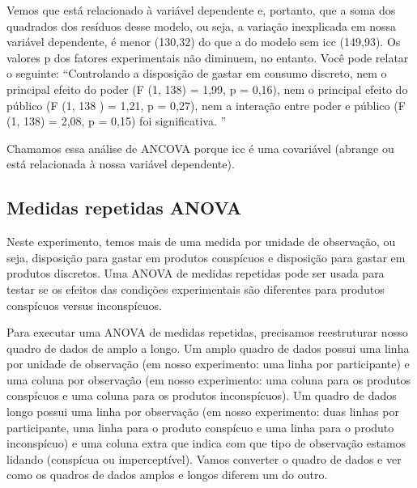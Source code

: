 \documentclass{article}
\begin{document}
Vemos que  está relacionado à variável dependente e, portanto, que a soma dos quadrados dos resíduos desse modelo, ou seja, a variação inexplicada em nossa variável dependente, é menor (130,32) do que a do modelo sem icc (149,93). Os valores p dos fatores experimentais não diminuem, no entanto. Você pode relatar o seguinte: “Controlando a disposição de gastar em consumo discreto, nem o principal efeito do poder (F (1, 138) = 1,99, p = 0,16), nem o principal efeito do público (F (1, 138 ) = 1,21, p = 0,27), nem a interação entre poder e público (F (1, 138) = 2,08, p = 0,15) foi significativa. ”

Chamamos essa análise de ANCOVA porque icc é uma covariável (abrange ou está relacionada à nossa variável dependente).


\subsection{Medidas repetidas ANOVA}

Neste experimento, temos mais de uma medida por unidade de observação, ou seja, disposição para gastar em produtos conspícuos e disposição para gastar em produtos discretos. Uma ANOVA de medidas repetidas pode ser usada para testar se os efeitos das condições experimentais são diferentes para produtos conspícuos versus inconspícuos.

Para executar uma ANOVA de medidas repetidas, precisamos reestruturar nosso quadro de dados de amplo a longo. Um amplo quadro de dados possui uma linha por unidade de observação (em nosso experimento: uma linha por participante) e uma coluna por observação (em nosso experimento: uma coluna para os produtos conspícuos e uma coluna para os produtos inconspícuos). Um quadro de dados longo possui uma linha por observação (em nosso experimento: duas linhas por participante, uma linha para o produto conspícuo e uma linha para o produto inconspícuo) e uma coluna extra que indica com que tipo de observação estamos lidando (conspícua ou imperceptível). Vamos converter o quadro de dados e ver como os quadros de dados amplos e longos diferem um do outro.
\end{document}

